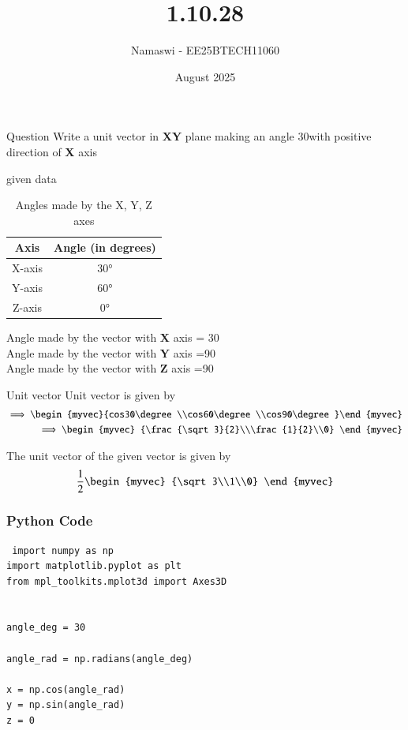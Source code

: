 \documentclass{beamer}
\title %
{1.10.28}
\date{August  2025}
\author %
{Namaswi - EE25BTECH11060}
\begin{document}
\frame{\titlepage}
\begin{frame}{Question}
Write a unit vector in \textbf{XY} plane making an angle 30\degree with positive direction of \textbf{X} axis
\end{frame}
 
\begin{frame}{given data}
\begin{table}[ht]
\centering
\begin{tabular}{|c|c|}
\hline
\textbf{Axis} & \textbf{Angle (in degrees)} \\
\hline
X-axis & 30° \\
Y-axis & 60° \\
Z-axis & 0° \\
\hline
\end{tabular}
\caption{Angles made by the X, Y, Z axes}
\end{table}

 Angle made by the vector with \textbf{X} axis = 30\degree\\
Angle made by the vector with \textbf{Y} axis =90\degree\\
Angle made by the vector with \textbf{Z} axis =90\degree\\
\end{frame}
\begin{frame}{Unit vector}
Unit vector is given by 
\begin{align*}
\implies
    \begin{myvec}{cos30\degree\\cos60\degree\\cos90\degree}\end{myvec}\\
    \implies
    \begin{myvec}
       {\frac{\sqrt3}{2}\\\frac{1}{2}\\0}
    \end{myvec}
\end{align*}

The unit  vector of the given vector is given by
\begin{align*}
\frac{1}{2}
         \begin{myvec}
         {\sqrt3\\1\\0}
        \end{myvec}   
\end{align*}
\end{frame}

\begin{frame}[fragile]
    \frametitle{Python Code}
    \begin{lstlisting}
 import numpy as np
import matplotlib.pyplot as plt
from mpl_toolkits.mplot3d import Axes3D


angle_deg = 30

angle_rad = np.radians(angle_deg)

x = np.cos(angle_rad)
y = np.sin(angle_rad)
z = 0  

\end{lstlisting}
\end{frame}
\end{document}
